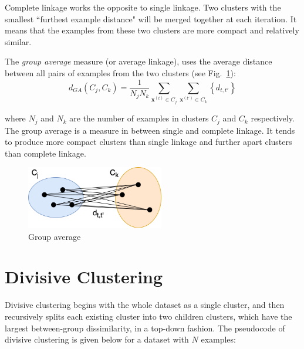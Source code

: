 Complete linkage works the opposite to single linkage. Two clusters with the smallest ``furthest example distance" will be merged together at each iteration. It means that the examples from these two clusters are more compact and relatively similar. 

The \textit{group average} measure (or average linkage), uses the average distance between all pairs of examples from the two clusters (see Fig.~\ref{fig:ga}): 
\[
d_{GA}\left ( C_j, C_k \right ) = \frac{1}{N_j N_k}\sum_{\mathbf{x}^{\left( t \right )} \in C_j}\sum_{\mathbf{x}^{\left( t' \right )} \in C_k} \left\{ d_{t,t'} \right\}
\]

\noindent
where $N_j$ and $N_k$ are the number of examples in clusters $C_j$ and $C_k$ respectively. The group average is a measure in between single and complete linkage. It tends to produce more compact clusters than single linkage and further apart clusters than complete linkage.

\begin{figure}[htp]
\centering
\captionsetup{justification=centering}
\includegraphics[width=6cm]{"Part 3 - Learning Systems/Unsupervised Learning/Hierarchical Clustering/figures/GroupAverage.png"}
\caption{Group average}
\label{fig:ga}
\end{figure}

\section{Divisive Clustering}
\label{sec:div-cluster}

Divisive clustering begins with the whole dataset as a single cluster, and then recursively splits each existing cluster into two children clusters, which have the largest between-group dissimilarity, in a top-down fashion. The pseudocode of divisive clustering is given below for a dataset with $N$ examples:

